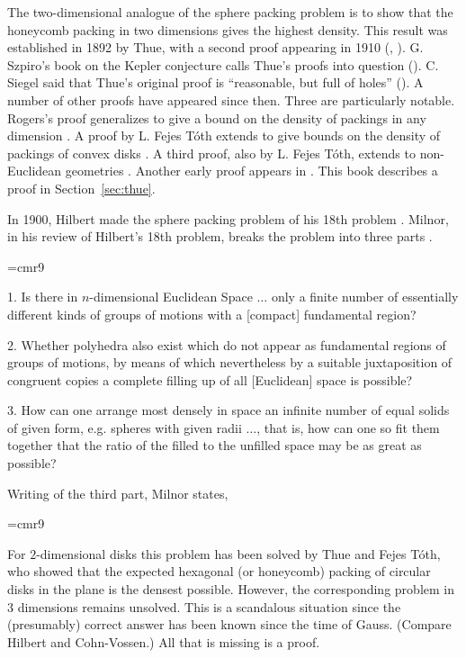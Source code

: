 The two-dimensional analogue of the sphere packing problem is to show
that the honeycomb packing in two dimensions gives the highest
density.  This result was established in 1892 by Thue, 
with a second
proof appearing in 1910 (\cite{Thu92}, \cite{Thu10}). G. Szpiro's
book on the Kepler conjecture calls Thue's proofs into question
(\cite{Szp02}).  C. Siegel 
said that Thue's original proof is
``reasonable, but full of holes'' (\cite{Szp02}). A number of other
proofs have appeared since then. Three are particularly notable.
Rogers's proof generalizes to give a bound on the density of
packings in any dimension \cite{Rog58}. A proof by L. Fejes T\'oth
extends to give bounds on the density of packings of convex disks
\cite{Fej50}. A third proof, also by L. Fejes T\'oth, extends to
non-Euclidean geometries \cite{Fej53}. Another early proof appears
in \cite{SeM44}.  This book describes a proof in Section~\ref{sec:thue}.

In 1900, Hilbert made the sphere packing problem of his 18th
problem \cite{hilbert}. Milnor, 
 in his review of Hilbert's 18th
problem, breaks the problem into three parts \cite{Mil76}.

{
\narrower
\font\ninerm=cmr9
\ninerm

1.  Is there in $n$-dimensional Euclidean Space $\ldots$ only a finite
number of essentially different kinds of groups of motions with a
[compact] fundamental region?

2.  Whether polyhedra also exist which do not appear as fundamental
    regions of groups of motions, by means of which nevertheless
    by a suitable juxtaposition of congruent copies a complete filling
    up of all [Euclidean] space is possible?

3.  How can one arrange most densely in space an infinite number
    of equal solids of given form, e.g. spheres with given radii $\ldots$,
    that is, how can one so fit them together that the ratio of the
    filled to the unfilled space may be as great as possible?

}

\smallskip
Writing of the third part, Milnor states,

{
\narrower
\font\ninerm=cmr9
\ninerm

For $2$-dimensional disks this problem has been solved by Thue and
Fejes T\'oth, who showed that the expected hexagonal (or honeycomb)
packing of circular disks in the plane is the densest possible.
However, the corresponding problem in $3$ dimensions remains
unsolved. This is a scandalous situation since the (presumably)
correct answer has been known since the time of Gauss. (Compare
Hilbert and Cohn-Vossen.)  All that is missing is a proof.
}

